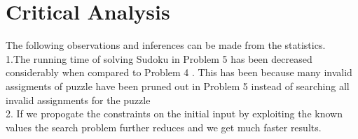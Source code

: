 \documentclass[11pt]{article}
\begin{document}
\section{  Critical Analysis }



The following observations and inferences can be made from the statistics.\\


1.The running time of solving Sudoku in Problem 5  has been decreased  considerably when compared to Problem 4 . This has been because many invalid assigments of puzzle have been pruned out in Problem 5 instead of searching  all invalid assignments for the puzzle\\



2. If we propogate the constraints on the initial input by exploiting the known values the search problem further reduces and we get much faster results.
\end{document}
